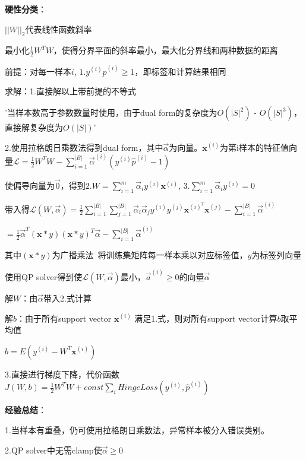 \documentclass[UTF8]{ctexart}
\begin{document}
  \quad \textbf{硬性分类}：

  \quad \quad $||W||_2$代表线性函数斜率

  \quad \quad 最小化$\frac{1}{2}W^TW$，使得分界平面的斜率最小，最大化分界线和两种数据的距离

  \quad \quad 前提：对每一样本$i$, $1.y^{(i)}\hat{p}^{(i)} \geq 1$，即标签和计算结果相同

  \quad \quad 求解：1.直接解以上带前提的不等式

  \quad \quad \quad '当样本数高于参数数量时使用，由于dual form的复杂度为$O(|S|^2)$ - $O(|S|^3)$，直接解复杂度为$O(|S|)$'
  
  \quad \quad 2.使用拉格朗日乘数法得到dual form，其中$\vec{\alpha}$为向量。$\textbf{x}^{(i)}$为第i样本的特征值向量$\mathcal{L} = \frac{1}{2}W^TW - \sum_{i=1}^{|B|}\vec{\alpha}^{(i)}(y^{(i)}\hat{p}^{(i)} - 1)$

  \quad \quad \quad 使偏导向量为$\vec{0} $，得到$2.W = \sum_{i=1}^{m}\vec{\alpha}_iy^{(i)}\textbf{x}^{(i)}$, $3.\sum_{i=1}^{m}\vec{\alpha}_iy^{(i)}=0$

  \quad \quad \quad 带入得$\mathcal{L} (W, \vec{\alpha}) = \frac{1}{2}\sum_{i=1}^{|B|}\sum_{j=1}^{|B|}\vec{\alpha}_i\vec{\alpha}_jy^{(i)}y^{(j)}\textbf{x}^{(i)^T}\textbf{x}^{(j)} - \sum_{i=1}^{|B|}\vec{\alpha}^{(i)}$
  
  \quad \quad \quad \quad $=\frac{1}{2}\vec{\alpha}^T (\textbf{x} * y)(\textbf{x} * y)^T \vec{\alpha} - \sum_{i=1}^{|B|}\vec{\alpha}^{(i)}$

  \quad \quad \quad \quad 其中$(\textbf{x} * y)$为广播乘法\ 将训练集矩阵每一样本乘以对应标签值，$y$为标签列向量

  \quad \quad \quad 使用QP solver得到使$\mathcal{L} (W, \vec{\alpha})$最小，$\vec{a}^{(i)} \geq 0$的向量$\vec{\alpha}$

  \quad \quad \quad 解$W$：由$\vec{\alpha}$带入2.式计算

  \quad \quad \quad 解$b$：由于所有support vector $\textbf{x}^{(i)}$ 满足1.式，则对所有support vector计算$b$取平均值

  \quad \quad \quad \quad $b = E(y^{(i)}-W^T\textbf{x}^{(i)})$

  \quad \quad 3.直接进行梯度下降，代价函数$J(W, b) = \frac{1}{2}W^TW + const \sum_i HingeLoss(y^{(i)}, \hat{p}^{(i)})$
  
  \quad \quad \textbf{经验总结}：

  \quad \quad \quad 1.当样本有重叠，仍可使用拉格朗日乘数法，异常样本被分入错误类别。

  \quad \quad \quad 2.QP solver中无需clamp使$\vec{\alpha} \geq 0$
\end{document}
